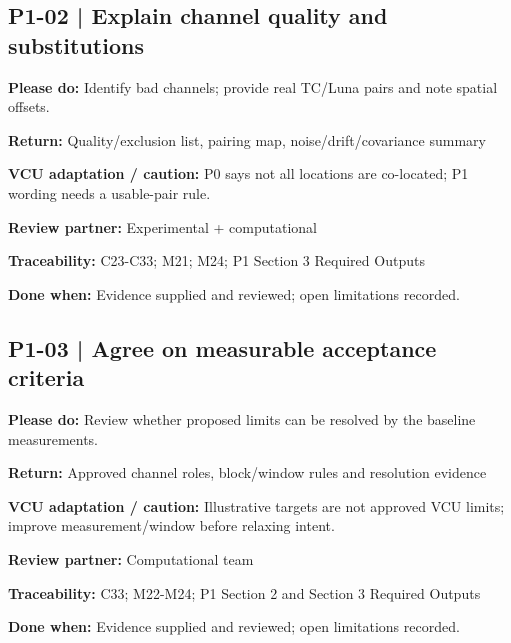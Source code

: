\documentclass[11pt]{article}
\begin{document}
\par\noindent\begin{minipage}{\textwidth}\small\setlength{\parskip}{2pt}
\subsection*{P1-02 | Explain channel quality and substitutions}
\textbf{Please do:} Identify bad channels; provide real TC/Luna pairs and note spatial offsets.\par
\textbf{Return:} Quality/exclusion list, pairing map, noise/drift/covariance summary\par
\textbf{VCU adaptation / caution:} P0 says not all locations are co-located; P1 wording needs a usable-pair rule.\par
\textbf{Review partner:} Experimental + computational\par
\textbf{Traceability:} C23-C33; M21; M24; P1 Section 3 Required Outputs\par
\textbf{Done when:} Evidence supplied and reviewed; open limitations recorded.\par
\end{minipage}\par\vspace{8pt}
\par\noindent\begin{minipage}{\textwidth}\small\setlength{\parskip}{2pt}
\subsection*{P1-03 | Agree on measurable acceptance criteria}
\textbf{Please do:} Review whether proposed limits can be resolved by the baseline measurements.\par
\textbf{Return:} Approved channel roles, block/window rules and resolution evidence\par
\textbf{VCU adaptation / caution:} Illustrative targets are not approved VCU limits; improve measurement/window before relaxing intent.\par
\textbf{Review partner:} Computational team\par
\textbf{Traceability:} C33; M22-M24; P1 Section 2 and Section 3 Required Outputs\par
\textbf{Done when:} Evidence supplied and reviewed; open limitations recorded.\par
\end{minipage}\par\vspace{8pt}
\end{document}
